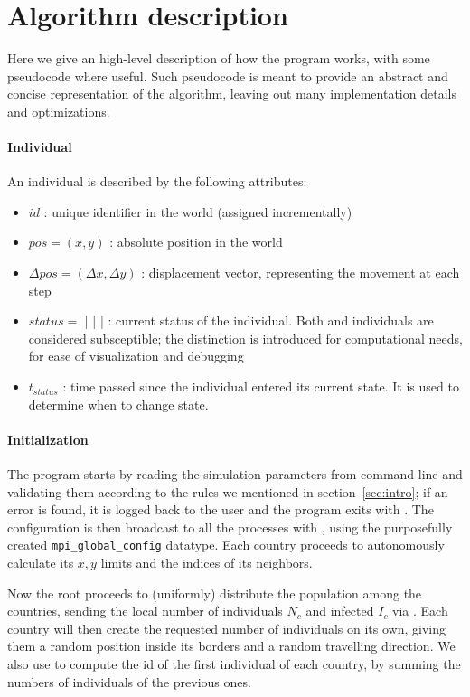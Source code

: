 \section{Algorithm description}
\label{sec:alg_desc}

Here we give an high-level description of how the program works, with some pseudocode where useful. Such pseudocode is meant to provide an abstract and concise representation of the algorithm, leaving out many implementation details and optimizations.

\paragraph{Individual}
An individual is described by the following attributes:
\begin{itemize}
    \item $id$ : unique identifier in the world (assigned incrementally)
    \item $pos = (x,y)$ : absolute position in the world
    \item $\Delta pos = (\Delta x,\Delta y)$ : displacement vector, representing the movement at each step
    \item $status =$ \NotExposed | \Exposed | \Infected | \Immune : current status of the individual. Both \NotExposed and \Exposed individuals are considered subsceptible; the distinction is introduced for computational needs, for ease of visualization and debugging
    \item $t_{status}$ : time passed since the individual entered its current state. It is used to determine when to change state.
\end{itemize}

\paragraph{Initialization}
The program starts by reading the simulation parameters from command line and validating them according to the rules we mentioned in section~\ref{sec:intro}; if an error is found, it is logged back to the user and the program exits with \MPIAbort.
The configuration is then broadcast to all the processes with \MPIBcast, using the purposefully created \texttt{mpi\_global\_config} datatype.
Each country proceeds to autonomously calculate its $x,y$ limits and the indices of its neighbors.

Now the root proceeds to (uniformly) distribute the population among the countries, sending the local number of individuals $N_c$ and infected $I_c$ via \MPIScatter. Each country will then create the requested number of individuals on its own, giving them a random position inside its borders and a random travelling direction.
We also use \MPIExscan to compute the id of the first individual of each country, by summing the numbers of individuals of the previous ones.

